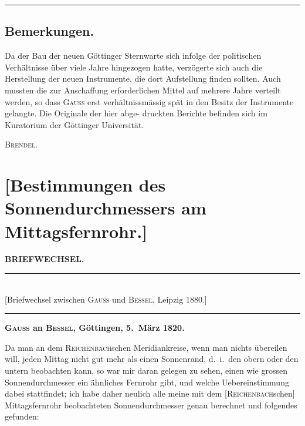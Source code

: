 \documentclass[12pt,a4paper]{article}
\theoremstyle{plain}
\theoremstyle{definition}
\theoremstyle{remark}
\begin{document}
\medskip
\begin{center}
\rule{0.5\textwidth}{0.4pt}
\end{center}

\subsection*{Bemerkungen.}

Da der Bau der neuen G\"{o}ttinger Sternwarte sich infolge der politischen Verh\"{a}ltnisse \"{u}ber viele Jahre
hingezogen hatte, verz\"{o}gerte sich auch die Herstellung der neuen Instrumente, die dort Aufstellung finden
sollten. Auch mussten die zur Anschaffung erforderlichen Mittel auf mehrere Jahre verteilt werden, so dass
\textsc{Gauss} erst verh\"{a}ltnissm\"{a}ssig sp\"{a}t in den Besitz der Instrumente gelangte. Die Originale der hier abge-
druckten Berichte befinden sich im Kuratorium der G\"{o}ttinger Universit\"{a}t.

\begin{flushright}
\textsc{Brendel}.
\end{flushright}

\newpage
\section*{[Bestimmungen des Sonnendurchmessers am Mittagsfernrohr.]}

\begin{center}
\Large\textbf{BRIEFWECHSEL.}
\end{center}

\begin{center}
\rule{0.6\textwidth}{0.4pt}\\[0.3em]
{\small [Briefwechsel zwischen \textsc{Gauss} und \textsc{Bessel}, Leipzig 1880.]}\\[0.3em]
\rule{0.6\textwidth}{0.4pt}
\end{center}

\medskip
\textbf{\textsc{Gauss} an \textsc{Bessel}, G\"{o}ttingen, 5.\ M\"{a}rz 1820.}

\medskip
Da man an dem \textsc{Reichenbach}schen Meridiankreise, wenn man nichts
\"{u}bereilen will, jeden Mittag nicht gut mehr als einen Sonnenrand, d.\ i.\ den
obern oder den untern beobachten kann, so war mir daran gelegen zu sehen,
einen wie grossen Sonnendurchmesser ein \"{a}hnliches Fernrohr gibt, und welche
Uebereinstimmung dabei stattfindet; ich habe daher neulich alle meine mit
dem [\textsc{Reichenbach}schen] Mittagsfernrohr beobachteten Sonnendurchmesser genau
berechnet und folgendes gefunden:
\end{document}
